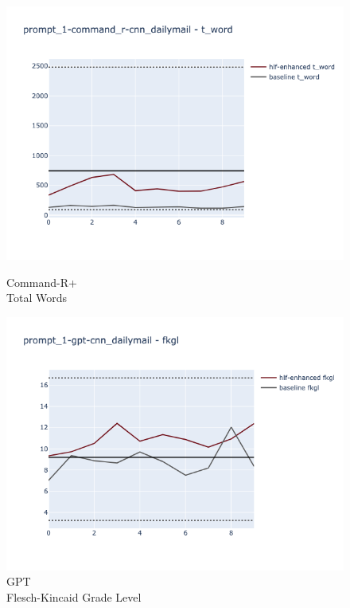 \documentclass[runningheads,a4paper,11pt]{article}
\begin{document}
\begin{figure}[ht!]
    \centering
    \begin{minipage}{0.32\textwidth}
        \includegraphics[width=\linewidth]{plots/prompt_1/prompt_1-command_r-cnn_dailymail/prompt_1-command_r-cnn_dailymail_t_word.png}
        \caption{Command-R+\\Total Words}
        \label{fig-command-r-t-word}
    \end{minipage}
    \hfill
    \begin{minipage}{0.32\textwidth}
        \includegraphics[width=\linewidth]{plots/prompt_1/prompt_1-gpt-cnn_dailymail/prompt_1-gpt-cnn_dailymail_fkgl.png}
        \caption{GPT\\Flesch-Kincaid Grade Level}

\end{minipage}
\end{figure}
\end{document}
